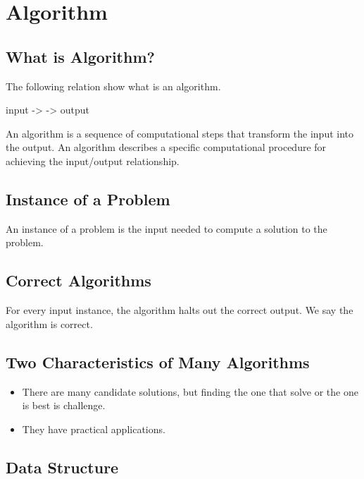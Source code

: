 
\chapter{Algorithm}


\section{What is Algorithm?}
\label{sec:what-algorithm}

The following relation show what is an algorithm.
\begin{tcolorbox}
input ->  -> output  
\end{tcolorbox}


An algorithm is a sequence of computational steps that transform the input into the output.
An algorithm describes a specific computational procedure for achieving the input/output relationship.

\section{Instance of a Problem}
\label{sec:instance-problem}


An instance of a problem is the input needed to compute a solution to the problem.

\section{Correct Algorithms}
\label{sec:correct-algorithms}


For every input instance, the algorithm halts out the correct output.
We say the algorithm is correct.


\section[Two Characteristics]{Two Characteristics of Many Algorithms}
\label{sec:two-char-many}

\begin{itemize}
\item There are many candidate solutions, but finding the one that solve or the one is best is challenge.
\item They have practical applications.
\end{itemize}

\section{Data Structure}
\label{sec:data-structure}



